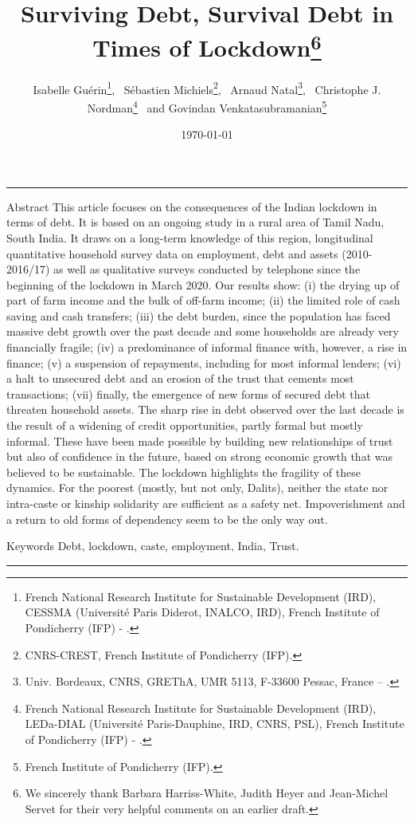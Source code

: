 \documentclass[a4paper, 11pt, onecolumn]{article}
\title{Surviving Debt, Survival Debt in Times of Lockdown\thanks{We sincerely thank Barbara Harriss-White, Judith Heyer and Jean-Michel Servet for their very helpful comments on an earlier draft.}}
\author{Isabelle Guérin\thanks{French National Research Institute for Sustainable Development (IRD), CESSMA (Université Paris Diderot, INALCO, IRD), French Institute of Pondicherry (IFP) - \email{isabelle.guerin@ird.fr}.}, ~Sébastien Michiels\thanks{CNRS-CREST, French Institute of Pondicherry (IFP).}, ~Arnaud Natal\thanks{Univ. Bordeaux, CNRS, GREThA, UMR 5113, F-33600 Pessac, France -- \email{arnaud.natal@u-bordeaux.fr}.}, ~Christophe J. Nordman\thanks{French National Research Institute for Sustainable Development (IRD), LEDa-DIAL (Université Paris-Dauphine, IRD, CNRS, PSL), French Institute of Pondicherry (IFP) - \email{nordman@dial.prd}.} ~and Govindan Venkatasubramanian\thanks{French Institute of Pondicherry (IFP).}}
\date{\today}
\begin{document}
\maketitle

\hrule 
\vspace{0.3cm}

\begin{resab}{Abstract}
This article focuses on the consequences of the Indian lockdown in terms of debt. It is based on an ongoing study in a rural area of Tamil Nadu, South India. It draws on a long-term knowledge of this region, longitudinal quantitative household survey data on employment, debt and assets (2010-2016/17) as well as qualitative surveys conducted by telephone since the beginning of the lockdown in March 2020. 
Our results show: (i) the drying up of part of farm income and the bulk of off-farm income; (ii) the limited role of cash saving and cash transfers; (iii) the debt burden, since the population has faced massive debt growth over the past decade and some households are already very financially fragile; (iv) a predominance of informal finance with, however, a rise in finance; (v) a suspension of repayments, including for most informal lenders; (vi) a halt to unsecured debt and an erosion of the trust that cements most transactions; (vii) finally, the emergence of new forms of secured debt that threaten household assets. The sharp rise in debt observed over the last decade is the result of a widening of credit opportunities, partly formal but mostly informal. These have been made possible by building new relationships of trust but also of confidence in the future, based on strong economic growth that was believed to be sustainable. The lockdown highlights the fragility of these dynamics. For the poorest (mostly, but not only, Dalits), neither the state nor intra-caste or kinship solidarity are sufficient as a safety net. Impoverishment and a return to old forms of dependency seem to be the only way out.  

\end{resab}

\begin{motkey}{Keywords}
Debt, lockdown, caste, employment, India, Trust.
\end{motkey}


\hrule










\end{document}
